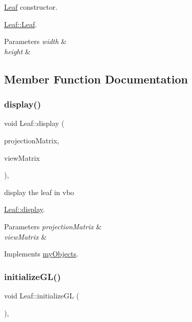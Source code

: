 \hyperlink{classLeaf}{Leaf} constructor. 

\hyperlink{classLeaf_a5549ab046aab3d58145ffaf99fd5579c}{Leaf\+::\+Leaf}.


\begin{DoxyParams}{Parameters}
{\em width} & \\
\hline
{\em height} & \\
\hline
\end{DoxyParams}


\subsection{Member Function Documentation}
\mbox{\label{classLeaf_a8eb757a10f15e34dd72522ae463c760c}} 
\subsubsection{\texorpdfstring{display()}{display()}}
{\footnotesize\ttfamily void Leaf\+::display (\begin{DoxyParamCaption}\item[{Q\+Matrix4x4 \&}]{projection\+Matrix,  }\item[{Q\+Matrix4x4 \&}]{view\+Matrix }\end{DoxyParamCaption})\hspace{0.3cm}{\ttfamily [override]}, {\ttfamily [virtual]}}



display the leaf in vbo 

\hyperlink{classLeaf_a8eb757a10f15e34dd72522ae463c760c}{Leaf\+::display}.


\begin{DoxyParams}{Parameters}
{\em projection\+Matrix} & \\
\hline
{\em view\+Matrix} & \\
\hline
\end{DoxyParams}


Implements \hyperlink{classmyObjects_a1e24feae7eecc42033706a88afec189b}{my\+Objects}.

\mbox{\label{classLeaf_a5c0c2ea2fdb32a5b2f8c91982d987f65}} 
\subsubsection{\texorpdfstring{initialize\+G\+L()}{initializeGL()}}
{\footnotesize\ttfamily void Leaf\+::initialize\+GL (\begin{DoxyParamCaption}{ }\end{DoxyParamCaption})\hspace{0.3cm}{\ttfamily [override]}, {\ttfamily [virtual]}}



